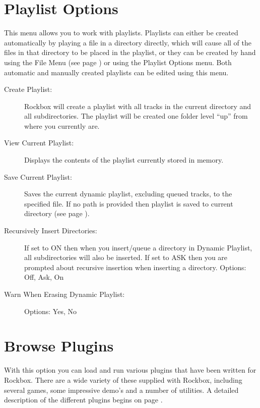 \section{\label{ref:playlistoptions}Playlist Options}
  This menu allows you to work with playlists. Playlists can either be created
automatically by playing a file in a directory directly, which will cause all 
of the files in that directory to be placed in the playlist, or they can be
created by hand using the File Menu (see page \pageref{ref:Filemenu}) or using 
the Playlist Options menu.  Both  automatic and manually created playlists 
can be edited using this menu.

\begin{description}
\item[Create Playlist:]
  Rockbox will create a playlist with all tracks in the current directory 
and all subdirectories. The playlist will be created one folder level ``up'' 
from where you currently are.
  
\item[View Current Playlist:]
  Displays the contents of the playlist currently stored in memory.
  
\item[Save Current Playlist:]
  Saves the current dynamic playlist, excluding queued tracks, to the 
specified file. If no path is provided then playlist is saved to current 
directory (see page \pageref{ref:Playlistsubmenu}).
  
\item[Recursively Insert Directories: ]
  If set to ON then when you insert/queue a directory in Dynamic Playlist, 
all subdirectories will also be inserted. If set to ASK then you are prompted 
about recursive insertion when inserting a directory.
  Options: Off, Ask, On

\item[Warn When Erasing Dynamic Playlist: ]
  Options: Yes, No
\end{description}

\section{Browse Plugins}
  With this option you can load and run various plugins that have been
written for Rockbox. There are a wide variety of these supplied with
Rockbox, including several games, some impressive demo's and a number of
utilities. A detailed description of the different plugins begins 
on page \pageref{ref:plugins}.

